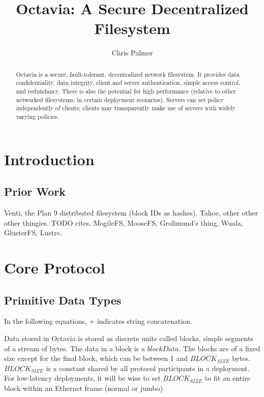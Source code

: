 \documentclass[letterpaper,9pt,twocolumn]{article}
\begin{document}
\author{Chris Palmer}
\title{Octavia: A Secure Decentralized Filesystem}
\maketitle

\begin{abstract}

Octavia is a secure, fault-tolerant, decentralized network filesystem. It
provides data confidentiality, data integrity, client and server
authentication, simple access control, and redundancy. There is also the
potential for high performance (relative to other networked filesystems, in
certain deployment scenarios). Servers can set policy independently of
clients; clients may transparently make use of servers with widely varying
policies. 

%

\end{abstract}


\section{Introduction}


\subsection{Prior Work}

Venti, the Plan 9 distributed filesystem (block IDs as hashes). Tahoe, other
other other thingies. TODO cites. MogileFS, MooseFS, Grolimund's thing,
Wuala, GlusterFS, Lustre.


\section{Core Protocol}

\subsection{Primitive Data Types}

In the following equations, $+$ indicates string concatenation.

Data stored in Octavia is stored as discrete units called blocks, simple
segments of a stream of bytes. The data in a block is a $blockData$. The
blocks are of a fixed size except for the final block, which can be between
1 and $BLOCK_{SIZE}$ bytes. $BLOCK_{SIZE}$ is a constant shared by all
protocol participants in a deployment. For low-latency deployments, it will
be wise to set $BLOCK_{SIZE}$ to fit an entire block within an Ethernet
frame (normal or jumbo).
\end{document}
